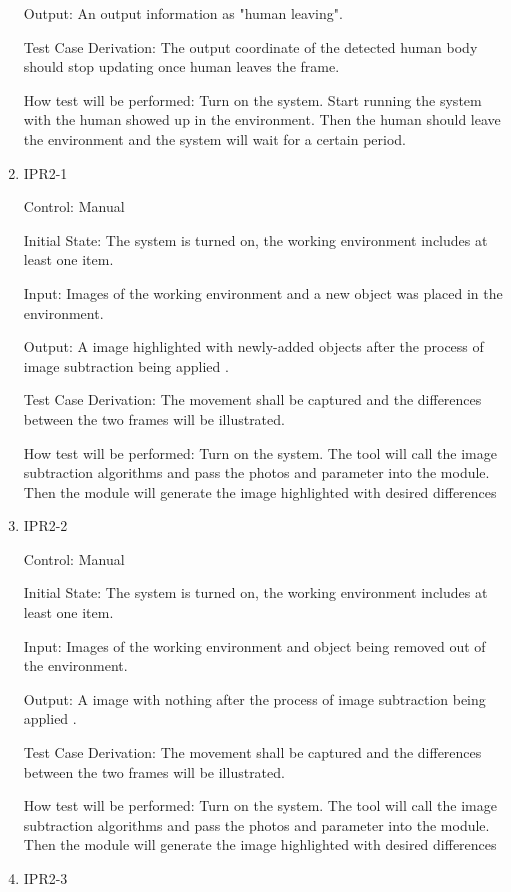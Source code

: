 \documentclass[12pt, titlepage]{article}
\begin{document}
\begin{enumerate}
Output: An output information as "human leaving".

Test Case Derivation: The output coordinate of the detected human body should stop updating once human leaves the frame.
					
How test will be performed: Turn on the system. Start running the system with the human showed up in the environment. Then the human should leave the environment and the system will wait for a certain period.


\item{IPR2-1\\}

Control: Manual
					
Initial State: The system is turned on, the working environment includes at least one item.
					
Input: Images of the working environment and a new object was placed in the environment.
					
Output: A image highlighted with newly-added objects after the process of image subtraction being applied .

Test Case Derivation: The movement shall be captured and the differences between the two frames will be illustrated.
					
How test will be performed: Turn on the system. The tool will call the image subtraction algorithms and pass the photos and parameter into the module. Then the module will generate the image highlighted with desired differences

\item{IPR2-2\\}

Control: Manual
					
Initial State: The system is turned on, the working environment includes at least one item.
					
Input: Images of the working environment and object being removed out of the environment.
					
Output: A image with nothing after the process of image subtraction being applied .

Test Case Derivation: The movement shall be captured and the differences between the two frames will be illustrated.
					
How test will be performed: Turn on the system. The tool will call the image subtraction algorithms and pass the photos and parameter into the module. Then the module will generate the image highlighted with desired differences

\item{IPR2-3\\}


\end{enumerate}
\end{document}
